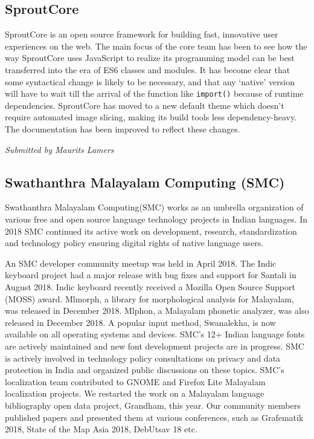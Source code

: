 \documentclass[a4paper]{report}
\begin{document}
\subsection{SproutCore}

SproutCore is an open source framework for building fast, innovative
user experiences on the web. The main focus of the core team has been
to see how the way SproutCore uses JavaScript to realize its programming
model can be best transferred into the era of ES6 classes and modules.
It has become clear that some syntactical change is likely to be
necessary, and that any `native' version will have to wait till the
arrival of the function like \texttt{import()} because of runtime
dependencies.  SproutCore has moved to a new default theme which doesn't
require automated image slicing, making its build tools less
dependency-heavy. The documentation has been improved to reflect these
changes.

{\em Submitted by Maurits Lamers}

\subsection{Swathanthra Malayalam Computing (SMC)}

Swathanthra Malayalam Computing(SMC) works as an umbrella organization
of various free and open source language technology projects in Indian
languages. In 2018 SMC continued its active work on development,
research, standardization and technology policy ensuring digital rights
of native language users.

An SMC developer community meetup was held in April 2018. The Indic
keyboard project had a major release with bug fixes and support for
Santali in August 2018. Indic keyboard recently received a Mozilla Open
Source Support (MOSS) award. Mlmorph, a library for morphological
analysis for Malayalam, was released in December 2018. Mlphon, a
Malayalam phonetic analyzer, was also released in December 2018. A
popular input method, Swanalekha, is now available on all operating
systems and devices. SMC's 12+ Indian language fonts are actively
maintained and new font development projects are in progress. SMC is
actively involved in technology policy consultations on privacy and data
protection in India and organized public discussions on these topics.
SMC's localization team contributed to GNOME and Firefox Lite Malayalam
localization projects. We restarted the work on a Malayalam language
bibliography open data project, Grandham, this year.  Our community
members published papers and presented them at various conferences, such
as Grafematik 2018, State of the Map Asia 2018, DebUtsav 18 etc.
\end{document}

